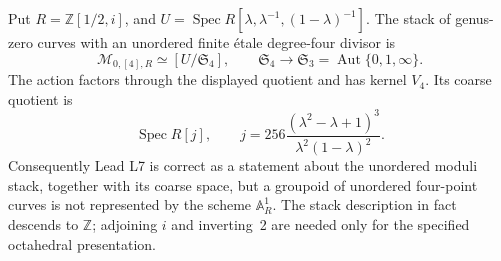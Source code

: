 \begin{proposition}
\label{A:unordered-stack}
Put $R=\mathbb Z[1/2,i]$, and
$U=\operatorname{Spec}R[\lambda,\lambda^{-1},(1-\lambda)^{-1}]$.
The stack of genus-zero curves with an unordered finite \'etale
degree-four divisor is
\[
 \mathcal M_{0,[4],R}\simeq[U/\mathfrak S_4],
 \qquad
 \mathfrak S_4\longrightarrow\mathfrak S_3
       =\operatorname{Aut}\{0,1,\infty\}.
\]
The action factors through the displayed quotient and has kernel
$V_4$. Its coarse quotient is
\[
 \operatorname{Spec}R[j],\qquad
 j=256\frac{(\lambda^2-\lambda+1)^3}
                    {\lambda^2(1-\lambda)^2}.
\]
Consequently Lead L7 is correct as a statement about the unordered
moduli stack, together with its coarse space, but a groupoid of
unordered four-point curves is not represented by the scheme
$\mathbb A^1_R$. The stack description in fact descends to
$\mathbb Z$; adjoining $i$ and inverting~2 are needed only for the
specified octahedral presentation.
\end{proposition}


